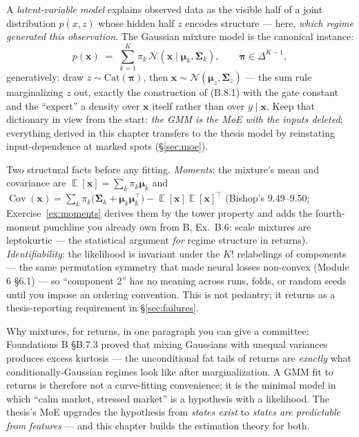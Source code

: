\documentclass[11pt]{article}
\numberwithin{equation}{section}
\theoremstyle{plain}
\theoremstyle{definition}
\theoremstyle{remark}
\DeclareMathOperator{\E}{\mathbb{E}}
\DeclareMathOperator{\Cov}{Cov}
\newcommand{\Normal}{\mathcal{N}}
\newcommand{\x}{\bm{x}}
\newcommand{\T}{\top}
\newcommand{\bmu}{\bm{\mu}}
\newcommand{\bSigma}{\bm{\Sigma}}
\newcommand{\bpi}{\bm{\pi}}
\begin{document}
A \emph{latent-variable model} explains observed data as the visible half of a joint distribution $p(x, z)$ whose hidden half $z$ encodes structure --- here, \emph{which regime generated this observation}. The Gaussian mixture model is the canonical instance:
\begin{equation}
p(\x) \;=\; \sum_{k=1}^{K} \pi_k\, \Normal(\x \mid \bmu_k, \bSigma_k),
\qquad
\bpi \in \Delta^{K-1},
\label{eq:gmm}
\end{equation}
generatively: draw $z \sim \mathrm{Cat}(\bpi)$, then $\x \sim \Normal(\bmu_z, \bSigma_z)$ --- the sum rule marginalizing $z$ out, exactly the construction of (B.8.1) with the gate constant and the ``expert'' a density over $\x$ itself rather than over $y \mid \x$. Keep that dictionary in view from the start: \emph{the GMM is the MoE with the inputs deleted}; everything derived in this chapter transfers to the thesis model by reinstating input-dependence at marked spots (\S\ref{sec:moe}).

Two structural facts before any fitting. \emph{Moments}: the mixture's mean and covariance are
$\E[\x] = \sum_k \pi_k \bmu_k$ and
$\Cov(\x) = \sum_k \pi_k\big(\bSigma_k + \bmu_k \bmu_k^\T\big) - \E[\x]\E[\x]^\T$
(Bishop's 9.49--9.50; Exercise~\ref{ex:moments} derives them by the tower property and adds the fourth-moment punchline you already own from B, Ex.\ B.6: scale mixtures are leptokurtic --- the statistical argument \emph{for} regime structure in returns). \emph{Identifiability}: the likelihood is invariant under the $K!$ relabelings of components --- the same permutation symmetry that made neural losses non-convex (Module 6 \S6.1) --- so ``component 2'' has no meaning across runs, folds, or random seeds until you impose an ordering convention. This is not pedantry; it returns as a thesis-reporting requirement in \S\ref{sec:failures}.

\begin{finbox}
Why mixtures, for returns, in one paragraph you can give a committee: Foundations B \S B.7.3 proved that mixing Gaussians with unequal variances produces excess kurtosis --- the unconditional fat tails of returns are \emph{exactly} what conditionally-Gaussian regimes look like after marginalization. A GMM fit to returns is therefore not a curve-fitting convenience; it is the minimal model in which ``calm market, stressed market'' is a hypothesis with a likelihood. The thesis's MoE upgrades the hypothesis from \emph{states exist} to \emph{states are predictable from features} --- and this chapter builds the estimation theory for both.
\end{finbox}
\end{document}
